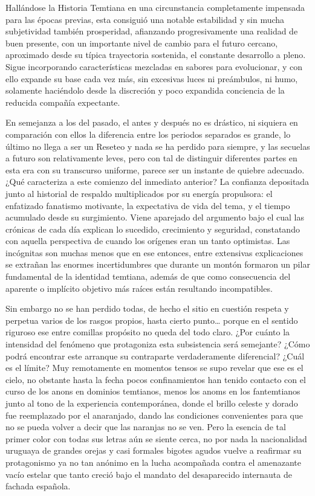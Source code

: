 \documentclass[
]{book}
\begin{document}
Hallándose la Historia Temtiana en una circunstancia completamente impensada para las épocas previas, esta consiguió una notable estabilidad y sin mucha subjetividad también prosperidad, afianzando progresivamente una realidad de buen presente, con un importante nivel de cambio para el futuro cercano, aproximado desde su típica trayectoria sostenida, el constante desarrollo a pleno. Sigue incorporando características mezcladas en sabores para evolucionar, y con ello expande su base cada vez más, sin excesivas luces ni preámbulos, ni humo, solamente haciéndolo desde la discreción y poco expandida conciencia de la reducida compañía expectante.

En semejanza a los del pasado, el antes y después no es drástico, ni siquiera en comparación con ellos la diferencia entre los periodos separados es grande, lo último no llega a ser un Reseteo y nada se ha perdido para siempre, y las secuelas a futuro son relativamente leves, pero con tal de distinguir diferentes partes en esta era con su transcurso uniforme, parece ser un instante de quiebre adecuado. ¿Qué caracteriza a este comienzo del inmediato anterior? La confianza depositada junto al historial de respaldo multiplicados por su energía propulsora: el enfatizado fanatismo motivante, la expectativa de vida del tema, y el tiempo acumulado desde su surgimiento. Viene aparejado del argumento bajo el cual las crónicas de cada día explican lo sucedido, crecimiento y seguridad, constatando con aquella perspectiva de cuando los orígenes eran un tanto optimistas. Las incógnitas son muchas menos que en ese entonces, entre extensivas explicaciones se extrañan las enormes incertidumbres que durante un montón formaron un pilar fundamental de la identidad temtiana, además de que como consecuencia del aparente o implícito objetivo más raíces están resultando incompatibles.

Sin embargo no se han perdido todas, de hecho el sitio en cuestión respeta y perpetua varios de los rasgos propios, hasta cierto punto\ldots{} porque en el sentido riguroso ese entre comillas propósito no queda del todo claro. ¿Por cuánto la intensidad del fenómeno que protagoniza esta subsistencia será semejante? ¿Cómo podrá encontrar este arranque su contraparte verdaderamente diferencial? ¿Cuál es el límite? Muy remotamente en momentos tensos se supo revelar que ese es el cielo, no obstante hasta la fecha pocos confinamientos han tenido contacto con el curso de los anons en dominios temtianos, menos los anoms en los fantemtianos junto al tono de la experiencia contemporánea, donde el brillo celeste y dorado fue reemplazado por el anaranjado, dando las condiciones convenientes para que no se pueda volver a decir que las naranjas no se ven. Pero la esencia de tal primer color con todas sus letras aún se siente cerca, no por nada la nacionalidad uruguaya de grandes orejas y casi formales bigotes agudos vuelve a reafirmar su protagonismo ya no tan anónimo en la lucha acompañada contra el amenazante vacío estelar que tanto creció bajo el mandato del desaparecido internauta de fachada española.
\end{document}
